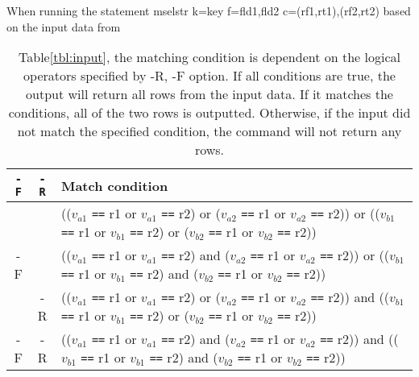 \documentclass[a4paper]{jarticle}
\begin{document}
\begin{table}[htbp]
\begin{center}
When running the statement mselstr k=key f=fld1,fld2 c=(rf1,rt1),(rf2,rt2) based on the input data from \caption{Table\ref{tbl:input}, the matching condition is dependent on the logical operators specified by -R, -F option. If all conditions are true, the output will return all rows from the input data. 
If it matches the conditions, all of the two rows is outputted. Otherwise, if the input did not match the specified condition, the command will not return any rows. \label{tbl:cond}}



{\small
\begin{tabular}{ccl}
\hline
\verb|-F| & \verb|-R| & Match condition \\
\hline
   &    &
(($v_{a1}$ \verb|==| r1 or $v_{a1}$ \verb|==| r2)  or
 ($v_{a2}$ \verb|==| r1 or $v_{a2}$ \verb|==| r2)) or
(($v_{b1}$ \verb|==| r1 or $v_{b1}$ \verb|==| r2)  or
 ($v_{b2}$ \verb|==| r1 or $v_{b2}$ \verb|==| r2)) \\
-F &    &
(($v_{a1}$ \verb|==| r1 or $v_{a1}$ \verb|==| r2)  and
 ($v_{a2}$ \verb|==| r1 or $v_{a2}$ \verb|==| r2)) or
(($v_{b1}$ \verb|==| r1 or $v_{b1}$ \verb|==| r2)  and
 ($v_{b2}$ \verb|==| r1 or $v_{b2}$ \verb|==| r2)) \\
   & -R & 
(($v_{a1}$ \verb|==| r1 or $v_{a1}$ \verb|==| r2)  or
 ($v_{a2}$ \verb|==| r1 or $v_{a2}$ \verb|==| r2)) and
(($v_{b1}$ \verb|==| r1 or $v_{b1}$ \verb|==| r2)  or
 ($v_{b2}$ \verb|==| r1 or $v_{b2}$ \verb|==| r2)) \\
-F & -R & 
(($v_{a1}$ \verb|==| r1 or $v_{a1}$ \verb|==| r2)  and
 ($v_{a2}$ \verb|==| r1 or $v_{a2}$ \verb|==| r2)) and
(($v_{b1}$ \verb|==| r1 or $v_{b1}$ \verb|==| r2)  and
 ($v_{b2}$ \verb|==| r1 or $v_{b2}$ \verb|==| r2)) \\
\hline
\end{tabular}
}

\end{center}
\end{table}
\end{document}
